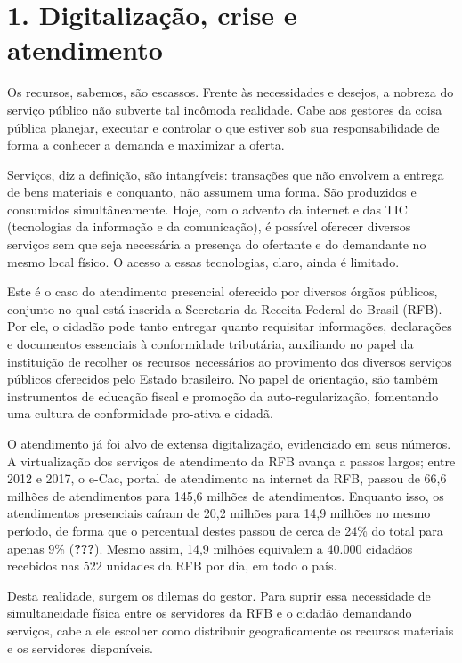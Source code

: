\documentclass[]{article}
\begin{document}
\hypertarget{digitalizacao-crise-e-atendimento}{%
\section{1. Digitalização, crise e
atendimento}\label{digitalizacao-crise-e-atendimento}}

Os recursos, sabemos, são escassos. Frente às necessidades e desejos, a
nobreza do serviço público não subverte tal incômoda realidade. Cabe aos
gestores da coisa pública planejar, executar e controlar o que estiver
sob sua responsabilidade de forma a conhecer a demanda e maximizar a
oferta.

Serviços, diz a definição, são intangíveis: transações que não envolvem
a entrega de bens materiais e conquanto, não assumem uma forma. São
produzidos e consumidos simultâneamente. Hoje, com o advento da internet
e das TIC (tecnologias da informação e da comunicação), é possível
oferecer diversos serviços sem que seja necessária a presença do
ofertante e do demandante no mesmo local físico. O acesso a essas
tecnologias, claro, ainda é limitado.

Este é o caso do atendimento presencial oferecido por diversos órgãos
públicos, conjunto no qual está inserida a Secretaria da Receita Federal
do Brasil (RFB). Por ele, o cidadão pode tanto entregar quanto
requisitar informações, declarações e documentos essenciais à
conformidade tributária, auxiliando no papel da instituição de recolher
os recursos necessários ao provimento dos diversos serviços públicos
oferecidos pelo Estado brasileiro. No papel de orientação, são também
instrumentos de educação fiscal e promoção da auto-regularização,
fomentando uma cultura de conformidade pro-ativa e cidadã.

O atendimento já foi alvo de extensa digitalização, evidenciado em seus
números. A virtualização dos serviços de atendimento da RFB avança a
passos largos; entre 2012 e 2017, o e-Cac, portal de atendimento na
internet da RFB, passou de 66,6 milhões de atendimentos para 145,6
milhões de atendimentos. Enquanto isso, os atendimentos presenciais
caíram de 20,2 milhões para 14,9 milhões no mesmo período, de forma que
o percentual destes passou de cerca de 24\% do total para apenas 9\%
({\textbf{???}}). Mesmo assim, 14,9 milhões equivalem a 40.000 cidadãos
recebidos nas 522 unidades da RFB por dia, em todo o país.

Desta realidade, surgem os dilemas do gestor. Para suprir essa
necessidade de simultaneidade física entre os servidores da RFB e o
cidadão demandando serviços, cabe a ele escolher como distribuir
geograficamente os recursos materiais e os servidores disponíveis.
\end{document}

